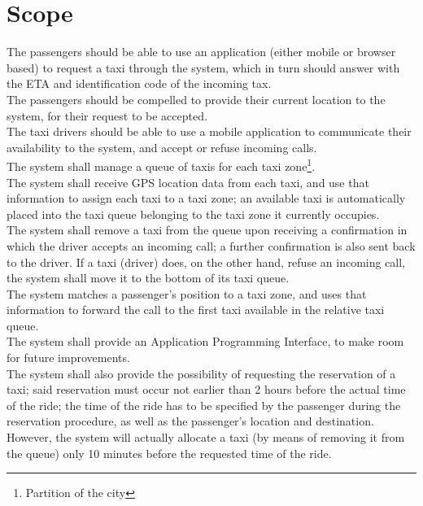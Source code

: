 \documentclass[a4paper,11pt]{report}
\begin{document}
\section{Scope}
The passengers should be able to use an application (either mobile or browser based) to request a taxi through the system,
which in turn should answer with the ETA and identification code of the incoming tax. \\
The passengers should be compelled to provide their current location to the system, for their request to be accepted. \\
The taxi drivers should be able to use a mobile application to communicate their availability to the system, and accept
 or refuse incoming calls. \\
The system shall manage a queue of taxis for each taxi zone\footnote{Partition of the city}. \\
The system shall receive GPS location data from each taxi, and use that information to assign each taxi to a 
taxi zone; an available taxi is automatically placed into the taxi queue belonging to the taxi zone it currently occupies. \\
The system shall remove a taxi from the queue upon receiving a confirmation in which the driver accepts an incoming call; a
further confirmation is also sent back to the driver. If a taxi (driver) does, on the other hand, refuse an incoming call, the system
shall move it to the bottom of its taxi queue. \\
The system matches a passenger's position to a taxi zone, and uses that information to forward the call to the first taxi
available in the relative taxi queue. \\
The system shall provide an Application Programming Interface, to make room for future improvements. \\
The system shall also provide the possibility of requesting the reservation of a taxi; said reservation must occur not earlier
than 2 hours before the actual time of the ride; the time of the ride has to be specified by the passenger during the
reservation procedure, as well as the passenger's location and destination. \\
However, the system will actually allocate a taxi (by means of removing it from the queue) only 10 minutes before the
requested time of the ride.
\end{document}
